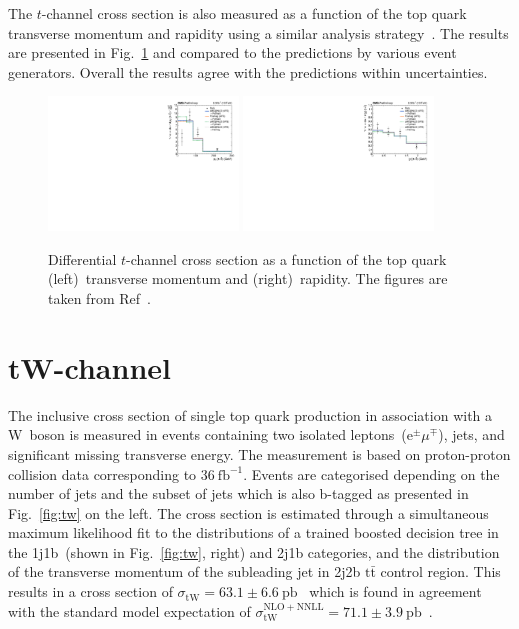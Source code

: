 \documentclass[12pt]{article}
\begin{document}
The $t$-channel cross section is also measured as a function of the top quark transverse momentum and rapidity using a similar analysis strategy~\cite{tchannel-diff}. The results are presented in Fig.~\ref{fig:tchan-diff} and compared to the predictions by various event generators. Overall the results agree with the predictions within uncertainties.

\begin{figure}[!htb]
\begin{center}
\includegraphics[width=0.45\textwidth]{unfolded_top_pt.pdf}\hspace{0.02\textwidth}
\includegraphics[width=0.45\textwidth]{unfolded_top_y.pdf}
\caption{\label{fig:tchan-diff}Differential $t$-channel cross section as a function of the top quark (left)~transverse momentum and (right)~rapidity. The figures are taken from Ref~\cite{tchannel-diff}.}
\end{center}
\end{figure}


\section{tW-channel}

The inclusive cross section of single top quark production in association with a W~boson is measured in events containing two isolated leptons~($\mathrm{e}^{\pm}\mu^{\mp}$), jets, and significant missing transverse energy. The measurement is based on proton-proton collision data corresponding to $36~\mathrm{fb}^{-1}$. Events are categorised depending on the number of jets and the subset of jets which is also b-tagged as presented in Fig.~\ref{fig:tw} on the left. The cross section is estimated through a simultaneous maximum likelihood fit to the distributions of a trained boosted decision tree in the 1j1b~(shown in Fig.~\ref{fig:tw}, right) and 2j1b categories, and the distribution of the transverse momentum of the subleading jet in 2j2b $\mathrm{t}\bar{\mathrm{t}}$ control region. This results in a cross section of $\sigma_\mathrm{tW}=63.1\pm6.6~\mathrm{pb}$~\cite{tw-inc} which is found in agreement with the standard model expectation of $\sigma_\mathrm{tW}^\mathrm{NLO+NNLL}=71.1\pm3.9~\mathrm{pb}$~\cite{kidonakis}.
\end{document}
